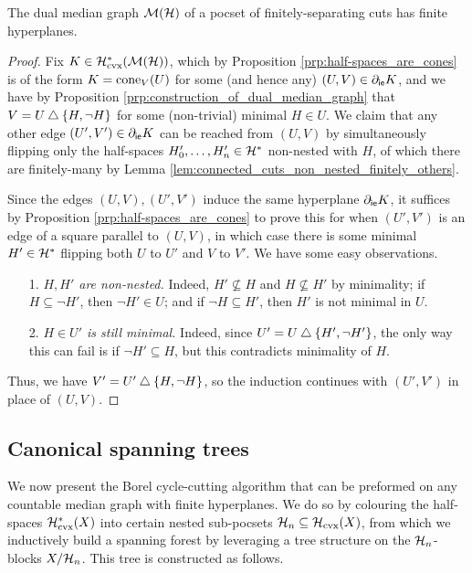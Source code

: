 \documentclass[reqno]{amsart}
\begin{document}
    \begin{proposition}\label{prp:dual_median_graph_of_cuts_has_finite_hyperplanes}
        The dual median graph $\mathcal{M}(\mathcal{H})$ of a pocset of finitely-separating cuts has finite hyperplanes.
    \end{proposition}
    \begin{proof}
        Fix $K\in\mathcal{H}^\ast_\mathrm{cvx}(\mathcal{M}(\mathcal{H}))$, which by Proposition \ref{prp:half-spaces_are_cones} is of the form $K=\operatorname{cone}_V(U)$ for some (and hence any) $(U,V)\in\partial_\mathsf{ie}K$, and we have by Proposition \ref{prp:construction_of_dual_median_graph} that $V=U\bigtriangleup\left\{H,\lnot H\right\}$ for some (non-trivial) minimal $H\in U$. We claim that any other edge $(U',V')\in\partial_\mathsf{ie}K$ can be reached from $(U,V)$ by simultaneously flipping only the half-spaces $H'_0,\dots,H'_n\in\mathcal{H}^\ast$ non-nested with $H$, of which there are finitely-many by Lemma \ref{lem:connected_cuts_non_nested_finitely_others}.

        Since the edges $(U,V),(U',V')$ induce the same hyperplane $\partial_\mathsf{ie}K$, it suffices by Proposition \ref{prp:half-spaces_are_cones} to prove this for when $(U',V')$ is an edge of a square parallel to $(U,V)$, in which case there is some minimal $H'\in\mathcal{H}^\ast$ flipping both  $U$ to $U'$ and $V$ to $V'$. We have some easy observations.
        \begin{enumerate}
            \item[1.] \textit{$H,H'$ are non-nested.} Indeed, $H'\not\subseteq H$ and $H\not\subseteq H'$ by minimality; if $H\subseteq\lnot H'$, then $\lnot H'\in U$; and if $\lnot H\subseteq H'$, then $H'$ is not minimal in $U$.
            \item[2.] \textit{$H\in U'$ is still minimal.} Indeed, since $U'=U\bigtriangleup\left\{H',\lnot H'\right\}$, the only way this can fail is if $\lnot H'\subseteq H$, but this contradicts minimality of $H$.
        \end{enumerate}
        Thus, we have $V'=U'\bigtriangleup\left\{H,\lnot H\right\}$, so the induction continues with $(U',V')$ in place of $(U,V)$.
    \end{proof}

    \subsection{Canonical spanning trees}\label{sec:cycle_cutting_algorithm}

    We now present the Borel cycle-cutting algorithm that can be preformed on any countable median graph with finite hyperplanes. We do so by colouring the half-spaces $\mathcal{H}^\ast_\mathrm{cvx}(X)$ into certain nested sub-pocsets $\mathcal{H}_n\subseteq\mathcal{H}_\mathrm{cvx}(X)$, from which we inductively build a spanning forest by leveraging a tree structure on the $\mathcal{H}_n$-blocks $X/\mathcal{H}_n$. This tree is constructed as follows.
\end{document}
